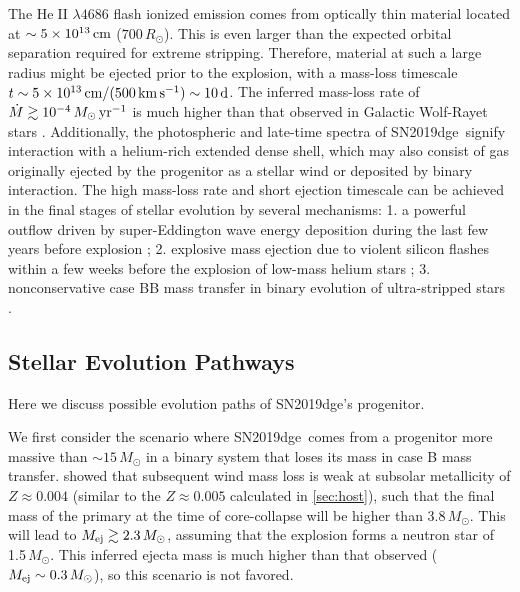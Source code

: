 \documentclass[twocolumn]{aastex63}
\newcommand{\name}{SN2019dge}
\def\ion#1#2{#1$\;${\footnotesize\rm{#2}}\relax}
\begin{document}
The \ion{He}{II} $\lambda4686$ flash ionized emission comes from optically thin material located at 
$\sim 5\times 10^{13}\,{\rm cm}$ ($700\,R_\odot$). This is even larger than the expected orbital 
separation required for extreme stripping. Therefore, material at such a large radius might be ejected 
prior to the explosion, with a mass-loss timescale $t \sim 5 \times 10^{13} \, {\rm cm}/(500 \, {\rm 
km}\,{\rm s}^{-1}) \sim 10 \, {\rm d}$. The inferred mass-loss rate of $\dot M \gtrsim 10^{-4}\,{ 
	M_\odot}\, \rm yr^{-1}$ is much higher than that observed in Galactic Wolf-Rayet stars 
\citep{Smith2014}. Additionally, the photospheric and late-time spectra of \name\ signify interaction 
with a helium-rich extended dense shell, which may also consist of gas originally ejected by 
the progenitor as a stellar wind or deposited by binary interaction. The high mass-loss rate and 
short ejection timescale can be achieved in the final stages of stellar evolution by several mechanisms: 
1. a powerful outflow driven by super-Eddington wave energy deposition
during the last few years before explosion \citep{Quataert2012}; 2. explosive mass ejection due to 
violent silicon flashes within a few weeks before the explosion of low-mass helium stars 
\citep{Woosley2019}; 3. nonconservative case BB
mass transfer in binary evolution of ultra-stripped stars \citep{Tauris2015}. 


\subsection{Stellar Evolution Pathways} \label{subsec:stellar_pathways}
Here we discuss possible evolution paths of \name's progenitor. 

We first consider the scenario where \name\ comes from a progenitor more massive than $\sim \! 15 \, 
M_\odot$ in a binary system that loses its mass in case B mass transfer. \citet{Yoon2010} showed that 
subsequent wind mass loss is weak at subsolar metallicity of $Z\approx 0.004$ (similar to the 
$Z\approx 0.005$ calculated in \ref{sec:host}), such that the final mass of the primary at 
the time of core-collapse will be higher than 3.8\,$M_\odot$.
This will lead to $M_{\rm ej}\gtrsim 2.3\,M_\odot$, assuming that the explosion forms a neutron star of 
1.5\,$M_\odot$. This inferred ejecta mass is much higher than that observed ($M_{\rm ej}\sim 0.3 \, 
M_\odot$), so this scenario is not favored. 
\end{document}
